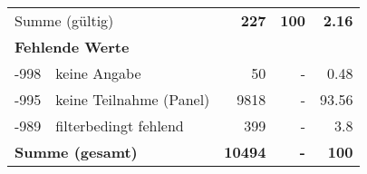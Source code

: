 \begin{longtable}{lXrrr}
     \midrule
     \multicolumn{2}{l}{Summe (gültig)} &
       \textbf{\num{227}} &
     \textbf{100} &
       \textbf{\num[round-mode=places,round-precision=2]{2,16}} \\
     \multicolumn{5}{l}{\textbf{Fehlende Werte}}\\
       -998 &
       keine Angabe &
         \num{50} &
        - &
         \num[round-mode=places,round-precision=2]{0,48} \\
       -995 &
       keine Teilnahme (Panel) &
         \num{9818} &
        - &
         \num[round-mode=places,round-precision=2]{93,56} \\
       -989 &
       filterbedingt fehlend &
         \num{399} &
        - &
         \num[round-mode=places,round-precision=2]{3,8} \\
     \midrule
     \multicolumn{2}{l}{\textbf{Summe (gesamt)}} &
          \textbf{\num{10494}} &
        \textbf{-} &
        \textbf{100} \\
     \bottomrule
     \end{longtable}
     
